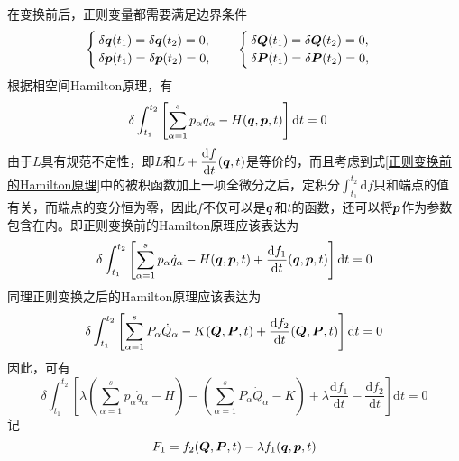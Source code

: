 在变换前后，正则变量都需要满足边界条件
\begin{align}
	\begin{cases}
		\delta\boldsymbol{q}(t_1) = \delta \boldsymbol{q}(t_2) = 0, \\
		\delta\boldsymbol{p}(t_1) = \delta \boldsymbol{p}(t_2) = 0,
	\end{cases}\quad 
	\begin{cases}
		\delta\boldsymbol{Q}(t_1) = \delta \boldsymbol{Q}(t_2) = 0, \\
		\delta\boldsymbol{P}(t_1) = \delta \boldsymbol{P}(t_2) = 0,
	\end{cases}
\end{align}
根据相空间Hamilton原理，有
\begin{align}
	& \delta \int_{t_1}^{t_2} \left[\sum_{\alpha=1}^s p_\alpha \dot{q}_\alpha - H(\mbf{q},\mbf{p},t)\right] \mathrm{d} t = 0 \label{正则变换前的Hamilton原理} %
\end{align}
由于$L$具有规范不定性，即$L$和$L+\dfrac{\mathrm{d} f}{\mathrm{d} t}(\boldsymbol{q},t)$是等价的，而且考虑到式\eqref{正则变换前的Hamilton原理}中的被积函数加上一项全微分之后，定积分$\displaystyle \int_{t_1}^{t_2} \mathrm{d} f$只和端点的值有关，而端点的变分恒为零，因此$f$不仅可以是$\boldsymbol{q}$和$t$的函数，还可以将$\boldsymbol{p}$作为参数包含在内。即正则变换前的Hamilton原理应该表达为
\begin{equation}
	\delta \int_{t_1}^{t_2} \left[\sum_{\alpha=1}^s p_\alpha \dot{q}_\alpha - H(\boldsymbol{q},\boldsymbol{p},t) + \frac{\mathrm{d} f_1}{\mathrm{d} t}(\boldsymbol{q},\boldsymbol{p},t)\right] \mathrm{d} t = 0 \label{正则变换前的Hamilton原理一般形式}
\end{equation}
同理正则变换之后的Hamilton原理应该表达为
\begin{equation}
	\delta \int_{t_1}^{t_2} \left[\sum_{\alpha=1}^s P_\alpha \dot{Q}_\alpha - K(\boldsymbol{Q},\boldsymbol{P},t) + \frac{\mathrm{d} f_2}{\mathrm{d} t}(\boldsymbol{Q},\boldsymbol{P},t)\right] \mathrm{d} t = 0 \label{正则变换前的Hamilton原理一般形式}
\end{equation}
因此，可有
\begin{equation}
	\delta \int_{t_1}^{t_2} \left[\lambda \left(\sum_{\alpha=1}^s p_\alpha \dot{q}_\alpha - H\right) - \left(\sum_{\alpha=1}^s P_\alpha \dot{Q}_\alpha - K\right) + \lambda \frac{\mathrm{d} f_1}{\mathrm{d} t} - \frac{\mathrm{d} f_2}{\mathrm{d} t}\right] \mathrm{d} t = 0
\end{equation}
记
\begin{equation}
	F_1 = f_2(\boldsymbol{Q},\boldsymbol{P},t) - \lambda f_1(\boldsymbol{q},\boldsymbol{p},t)
\end{equation}
